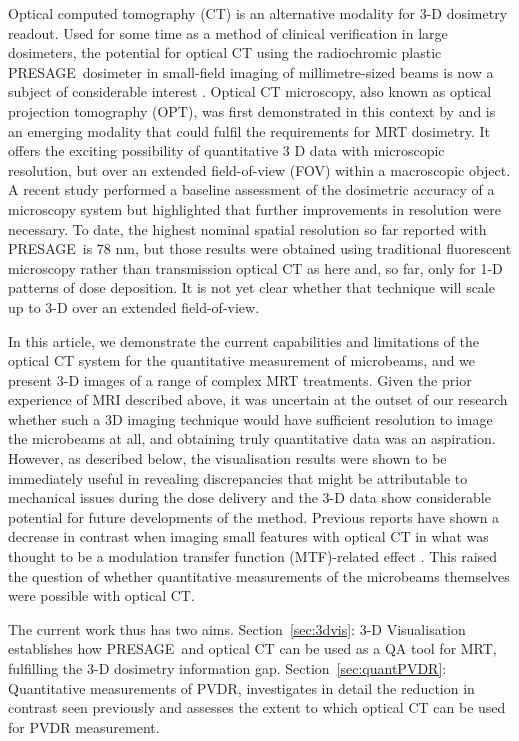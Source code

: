 \documentclass[12pt]{article}
\begin{document}
Optical computed tomography (CT) \cite{doranthe2009, goreradiation1996}  is an alternative modality for 3-D dosimetry readout. Used for some time as a method of clinical verification in large dosimeters, the potential for optical CT using the radiochromic plastic PRESAGE\textregistered \ dosimeter in small-field imaging of millimetre-sized beams is now a subject of considerable interest \cite{clift2010toward}. Optical CT microscopy, also known as optical projection tomography (OPT), was first demonstrated in this context by \cite{doranan2010} and is an emerging modality that could fulfil the requirements for MRT dosimetry. It offers the exciting possibility of quantitative 3 D data with microscopic resolution, but over an extended field-of-view (FOV) within a macroscopic object. A recent study \cite{doranestablishing2013} performed a baseline assessment of the dosimetric accuracy of a microscopy system but highlighted that further improvements in resolution were necessary. To date, the highest nominal spatial resolution so far reported with PRESAGE\textregistered  \ is 78 nm, but those results were obtained using traditional fluorescent microscopy \cite{annabellevaluating2012} rather than transmission optical CT as here and, so far, only for 1-D patterns of dose deposition. It is not yet clear whether that technique will scale up to 3-D over an extended field-of-view.

In this article, we demonstrate the current capabilities and limitations of the optical CT system for the quantitative measurement of microbeams, and we present 3-D images of a range of complex MRT treatments. Given the prior experience of MRI described above, it was uncertain at the outset of our research whether such a 3D imaging technique would have sufficient resolution to image the microbeams at all, and obtaining truly quantitative data was an aspiration. However, as described below, the visualisation results were shown to be immediately useful in revealing discrepancies that might be attributable to mechanical issues during the dose delivery and the 3-D data show considerable potential for future developments of the method. Previous reports have shown a decrease in contrast when imaging small features with optical CT in what was thought to be a modulation transfer function (MTF)-related effect \cite{doranultra-high2013}. This raised the question of whether quantitative measurements of the microbeams themselves were possible with optical CT.

The current work thus has two aims. Section~\ref{sec:3dvis}: 3-D Visualisation establishes how PRESAGE\textregistered \ and optical CT can be used as a QA tool for MRT, fulfilling the 3-D dosimetry information gap. Section~\ref{sec:quantPVDR}: Quantitative measurements of PVDR, investigates in detail the reduction in contrast seen previously and assesses the extent to which optical CT can be used for PVDR measurement. 
\end{document}
